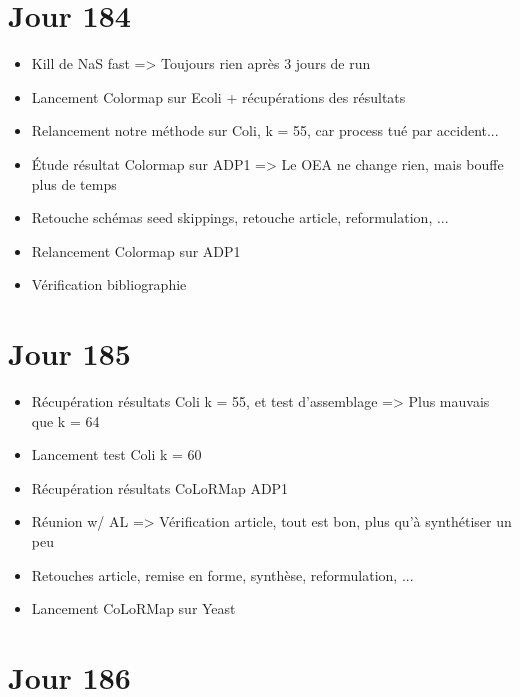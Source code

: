 \documentclass[12pt]{report}
\begin{document}
\section{Jour 184}

\begin{itemize}
	\item Kill de NaS fast => Toujours rien après 3 jours de run
	
	\item Lancement Colormap sur Ecoli + récupérations des résultats
	
	\item Relancement notre méthode sur Coli, k = 55, car process tué par accident...
	
	\item Étude résultat Colormap sur ADP1 => Le OEA ne change rien, mais bouffe plus de temps
	
	\item Retouche schémas seed skippings, retouche article, reformulation, ...
	
	\item Relancement Colormap sur ADP1
	
	\item Vérification bibliographie
\end{itemize}

\section{Jour 185}

\begin{itemize}
	\item Récupération résultats Coli k = 55, et test d'assemblage => Plus mauvais que k = 64
	
	\item Lancement test Coli k = 60
	
	\item Récupération résultats CoLoRMap ADP1
	
	\item Réunion w/ AL => Vérification article, tout est bon, plus qu'à synthétiser un peu
	
	\item Retouches article, remise en forme, synthèse, reformulation, ...
	
	\item Lancement CoLoRMap sur Yeast
\end{itemize}

\section{Jour 186}
\end{document}
